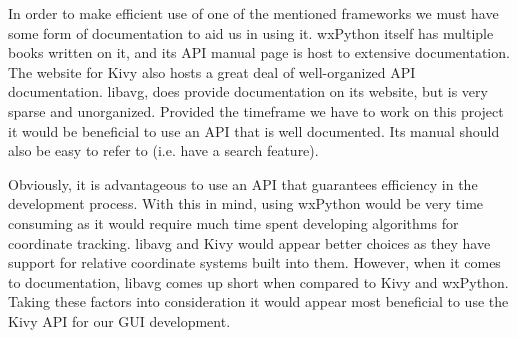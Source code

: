 \documentclass[journal,10pt,onecolumn,compsoc]{IEEEtran} \usepackage[margin=1.0in]{geometry} \usepackage{pdfpages} \usepackage{graphicx}
\begin{document}
\noindent In order to make efficient use of one of the mentioned frameworks we must have some form of documentation to aid us in using it.
wxPython itself has multiple books written on it, and its API manual page is host to extensive documentation.
The website for Kivy also hosts a great deal of well-organized API documentation.
libavg, does provide documentation on its website, but is very sparse and unorganized.
Provided the timeframe we have to work on this project it would be beneficial to use an API that is well documented. 
Its manual should also be easy to refer to (i.e. have a search feature).

\noindent Obviously, it is advantageous to use an API that guarantees efficiency in the development process. 
With this in mind, using wxPython would be very time consuming as it would require much time spent developing algorithms for coordinate tracking.
libavg and Kivy would appear better choices as they have support for relative coordinate systems built into them.
However, when it comes to documentation, libavg comes up short when compared to Kivy and wxPython.
Taking these factors into consideration it would appear most beneficial to use the Kivy API for our GUI development.
\newpage



\end{document}
